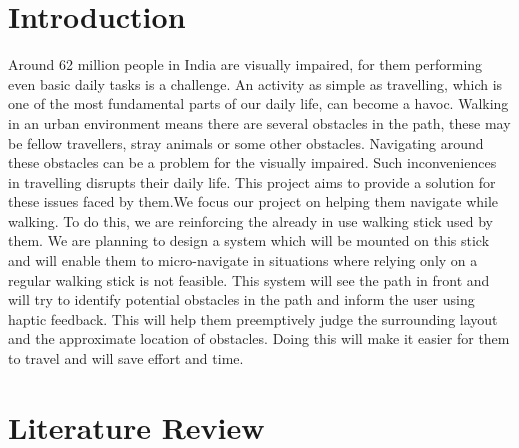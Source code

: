 \documentclass[conference]{IEEEtran}
\begin{document}
\section{Introduction}
Around 62 million people in India are visually impaired, for them performing even basic daily tasks is a challenge. An activity as simple as travelling, which is one of the most fundamental parts of our daily life, can become a havoc. Walking in an urban environment means there are several obstacles in the path, these may be fellow travellers, stray animals or some other obstacles. Navigating around these obstacles can be a problem for the visually impaired. Such inconveniences in travelling disrupts their daily life. This project aims to provide a solution for these issues faced by them.We focus our project on helping them navigate while walking. To do this, we are reinforcing the already in use walking stick used by them. We are planning to design a system which will be mounted on this stick and will enable them to micro-navigate in situations where relying only on a regular walking stick is not feasible. This system will see the path in front and will try to identify potential obstacles in the path and inform the user using haptic feedback. This will help them preemptively judge the surrounding layout and the approximate location of obstacles. Doing this will make it easier for them to travel and will save effort and time. 

\section{Literature Review}

\end{document}
